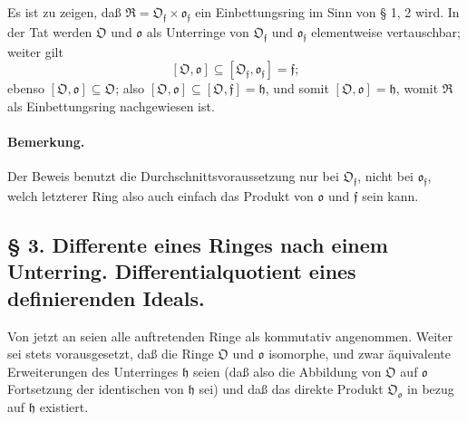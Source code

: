 Es ist zu zeigen, daß $\mathfrak R=\mathfrak O_{\mathfrak f}\times\mathfrak o_{\mathfrak f}$ ein Einbettungsring im Sinn von § 1, 2 wird. In der Tat werden $\mathfrak O$ und $\mathfrak o$ als Unterringe von $\mathfrak O_{\mathfrak f}$ und $\mathfrak o_{\mathfrak f}$ elementweise vertauschbar; weiter gilt
\[
[\mathfrak O,\mathfrak o]\subseteq[\mathfrak O_{\mathfrak f},\mathfrak o_{\mathfrak f}]=\mathfrak f;
\]
ebenso $[\mathfrak O,\mathfrak o]\subseteq\mathfrak O$; also $[\mathfrak O,\mathfrak o]\subseteq[\mathfrak O,\mathfrak f]=\mathfrak h$, und somit $[\mathfrak O,\mathfrak o]=\mathfrak h$, womit $\mathfrak R$ als Einbettungsring nachgewiesen ist.

\paragraph{Bemerkung.}
Der Beweis benutzt die Durchschnittsvoraussetzung nur bei $\mathfrak O_{\mathfrak f}$, nicht bei $\mathfrak o_{\mathfrak f}$, welch letzterer Ring also auch einfach das Produkt von $\mathfrak o$ und $\mathfrak f$ sein kann.

\subsection*{§ 3. Differente eines Ringes nach einem Unterring. Differentialquotient eines definierenden Ideals.}

Von jetzt an seien alle auftretenden Ringe als kommutativ angenommen. Weiter sei stets vorausgesetzt, daß die Ringe $\mathfrak O$ und $\mathfrak o$ isomorphe, und zwar äquivalente Erweiterungen des Unterringes $\mathfrak h$ seien (daß also die Abbildung von $\mathfrak O$ auf $\mathfrak o$ Fortsetzung der identischen von $\mathfrak h$ sei) und daß das direkte Produkt $\mathfrak O_{\mathfrak o}$ in bezug auf $\mathfrak h$ existiert.

